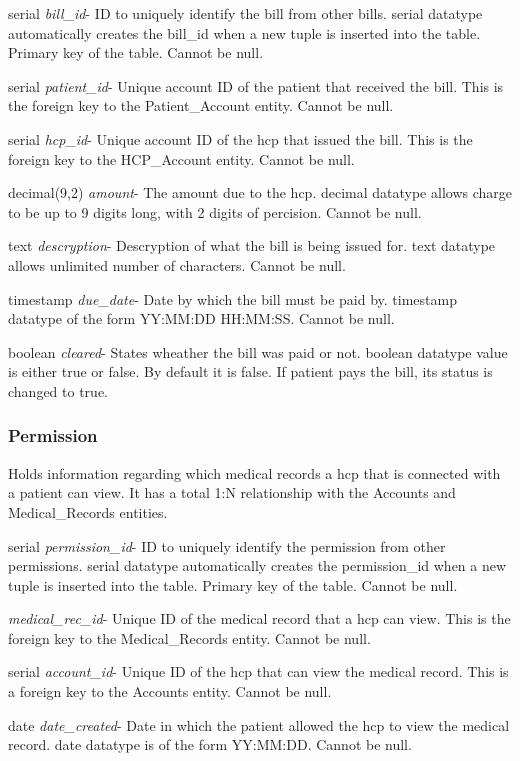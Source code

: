 \documentclass[12pt]{report}
\begin{document}
\begin{description}
\item serial \textit{bill\_id}-  ID to uniquely identify the bill from other bills. serial datatype automatically creates the bill\_id when a new tuple is inserted into the table.  Primary key of the table.  Cannot be null.
\item serial \textit{patient\_id}- Unique account ID of the patient that received the bill.  This is the foreign key to the Patient\_Account entity.  Cannot be null.
\item serial \textit{hcp\_id}- Unique account ID of the hcp that issued the bill.  This is the foreign key to the HCP\_Account entity.  Cannot be null.
\item decimal(9,2) \textit{amount}- The amount due to the hcp.  decimal datatype allows charge to be up to 9 digits long, with 2 digits of percision.  Cannot be null.
\item text \textit{descryption}- Descryption of what the bill is being issued for.  text datatype allows unlimited number of characters. Cannot be null.
\item timestamp \textit{due\_date}- Date by which the bill must be paid by.  timestamp datatype of the form YY:MM:DD HH:MM:SS.  Cannot be null.
\item boolean \textit{cleared}- States wheather the bill was paid or not.  boolean datatype value is either true or false.  By default it is false.  If patient pays the bill, its status is changed to true.
\end{description}

\subsubsection{Permission}
Holds information regarding which medical records a hcp that is connected with a patient can view.  It has a total 1:N relationship with the Accounts and Medical\_Records entities.

\begin{description}
\item serial \textit{permission\_id}-  ID to uniquely identify the permission from other permissions. serial datatype automatically creates the permission\_id when a new tuple is inserted into the table.  Primary key of the table.  Cannot be null.
\item \textit{medical\_rec\_id}- Unique ID of the medical record that a hcp can view.  This is the foreign key to the Medical\_Records entity.  Cannot be null.
\item serial \textit{account\_id}- Unique ID of the hcp that can view the medical record.  This is a foreign key to the Accounts entity.  Cannot be null.
\item date \textit{date\_created}-  Date in which the patient allowed the hcp to view the medical record.  date datatype is of the form YY:MM:DD.  Cannot be null.
\end{description}
\end{document}

